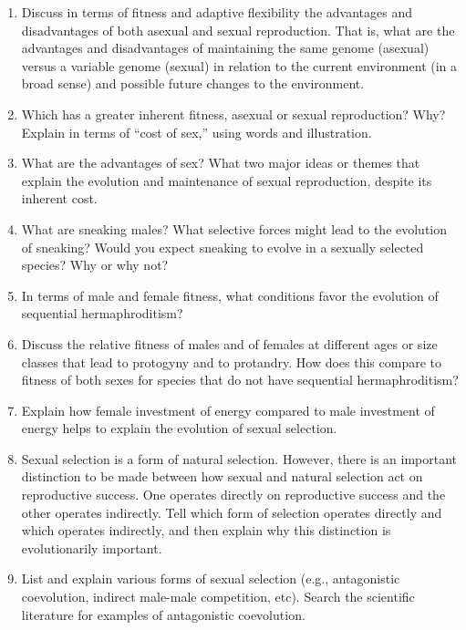 \documentclass[letterpaper]{tufte-handout}
\begin{document}
\begin{enumerate}
	\item Discuss in terms of fitness and adaptive flexibility the advantages and disadvantages of both asexual and sexual reproduction. That is, what are the advantages and disadvantages of maintaining the same genome (asexual) versus a variable genome (sexual) in relation to the current environment (in a broad sense) and possible future changes to the environment.

	\item Which has a greater inherent fitness, asexual or sexual reproduction?  Why?  Explain in terms of ``cost of sex,'' using words and illustration. 

	\item What are the advantages of sex?  What two major ideas or themes that explain the evolution and maintenance of sexual reproduction, despite its inherent cost.

	\item What are sneaking males?  What selective forces might lead to the evolution of sneaking?  Would you expect sneaking to evolve in a sexually selected species?  Why or why not?

	\item In terms of male and female fitness, what conditions favor the evolution of sequential hermaphroditism?

	\item Discuss the relative fitness of males and of females at different ages or size classes that lead to protogyny and to protandry.  How does this compare to fitness of both sexes for species that do not have sequential hermaphroditism? 

	\item Explain how female investment of energy compared to male investment of energy helps to explain the evolution of sexual selection.

	\item Sexual selection is a form of natural selection.  However, there is an important distinction to be made between how sexual and natural selection act on reproductive success.  One operates directly on reproductive success and the other operates indirectly. Tell which form of selection operates directly and which operates indirectly, and then explain why this distinction is evolutionarily important.

	\item List and explain various forms of sexual selection (e.g., antagonistic coevolution, indirect male-male competition, etc). Search the scientific literature for examples of antagonistic coevolution.


\end{enumerate}
\end{document}
